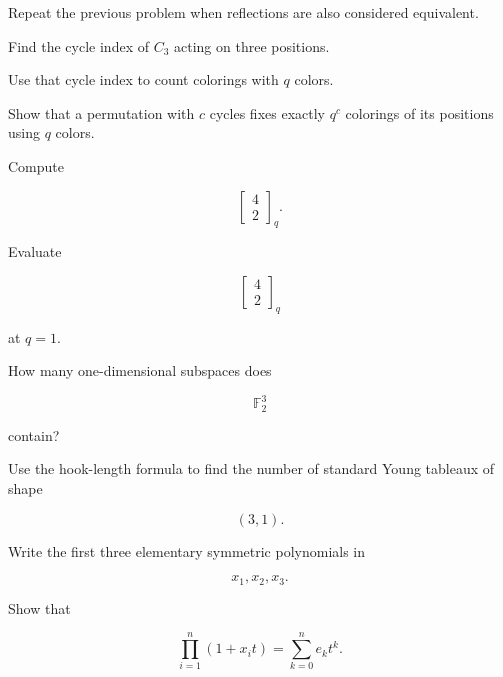 \begin{exercise}[2]
Repeat the previous problem when reflections are also considered
equivalent.
\end{exercise}

\begin{exercise}[2]
Find the cycle index of \(C_3\) acting on three positions.
\end{exercise}

\begin{exercise}[2]
Use that cycle index to count colorings with \(q\) colors.
\end{exercise}

\begin{exercise}[2]
Show that a permutation with \(c\) cycles fixes exactly \(q^c\)
colorings of its positions using \(q\) colors.
\end{exercise}

\begin{exercise}[2]
Compute

\[
\begin{bmatrix}
4\\
2
\end{bmatrix}_q.
\]
\end{exercise}

\begin{exercise}[2]
Evaluate

\[
\begin{bmatrix}
4\\
2
\end{bmatrix}_q
\]

at \(q=1\).
\end{exercise}

\begin{exercise}[2]
How many one-dimensional subspaces does

\[
\mathbb{F}_2^3
\]

contain?
\end{exercise}

\begin{exercise}[2]
Use the hook-length formula to find the number of standard Young
tableaux of shape

\[
(3,1).
\]
\end{exercise}

\begin{exercise}[2]
Write the first three elementary symmetric polynomials in

\[
x_1,x_2,x_3.
\]
\end{exercise}

\begin{exercise}[2]
Show that

\[
\prod_{i=1}^{n}(1+x_it)
=
\sum_{k=0}^{n}e_kt^k.
\]
\end{exercise}

